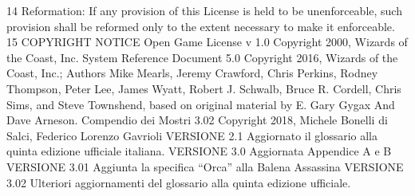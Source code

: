 \begin{multicols}{2}
14 Reformation: If any provision of this License is
held to be unenforceable, such provision shall be
reformed only to the extent necessary to make it
enforceable.
15 COPYRIGHT NOTICE
Open Game License v 1.0 Copyright 2000,
Wizards of the Coast, Inc.
System Reference Document 5.0 Copyright 2016,
Wizards of the Coast, Inc.; Authors Mike Mearls,
Jeremy Crawford, Chris Perkins, Rodney Thompson,
Peter Lee, James Wyatt, Robert J. Schwalb, Bruce R.
Cordell, Chris Sims, and Steve Townshend, based on
original material by E. Gary Gygax And Dave
Arneson.
Compendio dei Mostri 3.02 Copyright 2018, Michele
Bonelli di Salci, Federico Lorenzo Gavrioli
VERSIONE 2.1
Aggiornato il glossario alla quinta edizione ufficiale
italiana.
VERSIONE 3.0
Aggiornata Appendice A e B
VERSIONE 3.01
Aggiunta la specifica “Orca” alla Balena Assassina
VERSIONE 3.02
Ulteriori aggiornamenti del glossario alla quinta
edizione ufficiale.

\end{multicols}